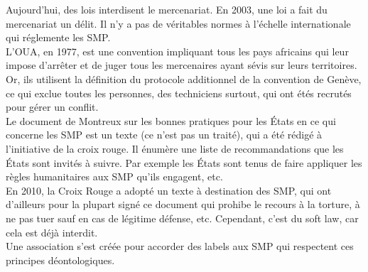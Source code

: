 \documentclass[10pt, a4paper, openany]{book}
\begin{document}
Aujourd'hui, des lois interdisent le mercenariat. En 2003, une loi a fait du mercenariat un délit. Il n'y a pas de véritables normes à l'échelle internationale qui réglemente les SMP. \\
L'OUA, en 1977, est une convention impliquant tous les pays africains qui leur impose d'arrêter et de juger tous les mercenaires ayant sévis sur leurs territoires. Or, ils utilisent la définition du protocole additionnel de la convention de Genève, ce qui exclue toutes les personnes, des techniciens surtout, qui ont étés recrutés pour gérer un conflit. \\
Le document de Montreux sur les bonnes pratiques pour les États en ce qui concerne les SMP est un texte (ce n'est pas un traité), qui a été rédigé à l'initiative de la croix rouge. Il énumère une liste de recommandations que les États sont invités à suivre. Par exemple les États sont tenus de faire appliquer les règles humanitaires aux SMP qu'ils engagent, etc. \\
En 2010, la Croix Rouge a adopté un texte à destination des SMP, qui ont d'ailleurs pour la plupart signé ce document qui prohibe le recours à la torture, à ne pas tuer sauf en cas de légitime défense, etc. Cependant, c'est du soft law, car cela est déjà interdit. \\
Une association s'est créée pour accorder des labels aux SMP qui respectent ces principes déontologiques. 
\end{document}
